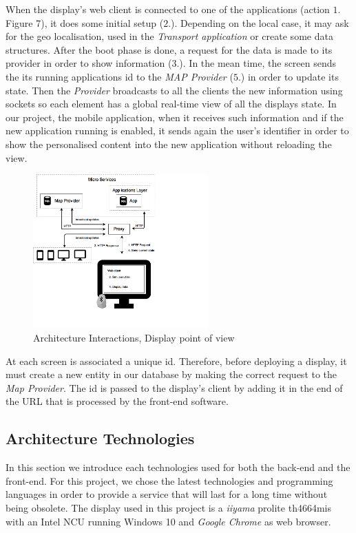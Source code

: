 \documentclass[]{usiinfbachelorproject}
\begin{document}
When the display's web client is connected to one of the applications (action $1.$ Figure 7), it does some initial setup ($2.$). Depending on the local case, it may ask for the geo localisation, used in the \emph{Transport application} or create some data structures. After the boot phase is done, a request for the data is made to its provider in order to show information ($3.$).
In the mean time, the screen sends the its running applications id to the \emph{MAP Provider} ($5.$) in order to update its state. Then the \emph{Provider} broadcasts to all the clients the new information using sockets so each element has a global real-time view of all the displays state. In our project, the mobile application, when it receives such information and if the new application running is enabled, it sends again the user's identifier in order to show the personalised content into the new application without reloading the view.
\begin{figure}[H]
  \centering
  \includegraphics[width=0.6\textwidth]{./images/elements_interactions_display.png}
  \caption{Architecture Interactions, Display point of view}
\end{figure} 
At each screen is associated a unique id. Therefore, before deploying a display, it must create a new entity in our database by making the correct request to the \emph{Map Provider}. The id is passed to the display's client by adding it in the end of the URL that is processed by the front-end software.
\subsection{Architecture Technologies}
In this section we introduce each technologies used for both the back-end and the front-end. For this project, we chose the latest technologies and programming languages in order to provide a service that will last for a long time without being obsolete. The display used in this project is a \emph{iiyama} prolite th4664mis with an Intel NCU running Windows 10 and \emph{Google Chrome} as web browser.
\end{document}
